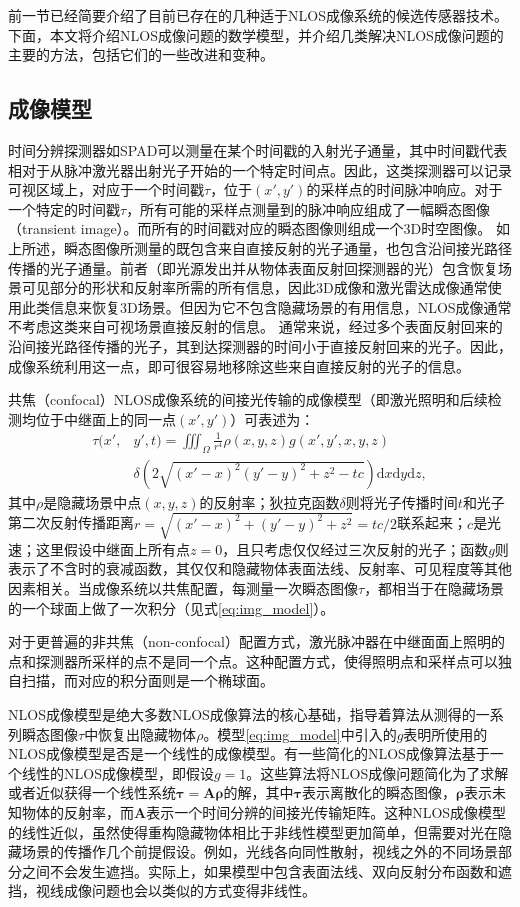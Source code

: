 \documentclass[master]{shtthesis}             %
\begin{document}
前一节已经简要介绍了目前已存在的几种适于NLOS成像系统的候选传感器技术。下面，本文将介绍NLOS成像问题的数学模型，并介绍几类解决NLOS成像问题的主要的方法，包括它们的一些改进和变种。

\subsection{成像模型}

时间分辨探测器如SPAD可以测量在某个时间戳的入射光子通量，其中时间戳代表相对于从脉冲激光器出射光子开始的一个特定时间点。因此，这类探测器可以记录可视区域上，对应于一个时间戳$\tau$，位于$(x',y')$的采样点的时间脉冲响应。对于一个特定的时间戳$\tau$，所有可能的采样点测量到的脉冲响应组成了一幅瞬态图像（transient image）。而所有的时间戳对应的瞬态图像则组成一个3D时空图像。
如上所述，瞬态图像所测量的既包含来自直接反射的光子通量，也包含沿间接光路径传播的光子通量。前者（即光源发出并从物体表面反射回探测器的光）包含恢复场景可见部分的形状和反射率所需的所有信息，因此3D成像和激光雷达成像通常使用此类信息来恢复3D场景。但因为它不包含隐藏场景的有用信息，NLOS成像通常不考虑这类来自可视场景直接反射的信息。
通常来说，经过多个表面反射回来的沿间接光路径传播的光子，其到达探测器的时间小于直接反射回来的光子。因此，成像系统利用这一点，即可很容易地移除这些来自直接反射的光子的信息。

共焦（confocal）NLOS成像系统的间接光传输的成像模型（即激光照明和后续检测均位于中继面上的同一点$(x',y')$）可表述为：
\begin{equation}\label{eq:img_model}
  \begin{split}
    \tau(x',&y',t)=\iiint_\Omega \frac{1}{r^4}\rho(x,y,z)g(x',y',x,y,z)\\ &\delta\left(2\sqrt{(x'-x)^2(y'-y)^2+z^2-tc}\right)\text{d}x\text{d}y\text{d}z,
  \end{split}
\end{equation}
其中$\rho$是隐藏场景中点$(x,y,z)$的反射率；狄拉克函数$\delta$则将光子传播时间$t$和光子第二次反射传播距离$r=\sqrt{(x'-x)^2+(y'-y)^2+z^2}=tc/2$联系起来；$c$是光速；这里假设中继面上所有点$z=0$，且只考虑仅仅经过三次反射的光子；函数$g$则表示了不含时的衰减函数，其仅仅和隐藏物体表面法线、反射率、可见程度等其他因素相关。当成像系统以共焦配置，每测量一次瞬态图像$\tau$，都相当于在隐藏场景的一个球面上做了一次积分（见式\ref{eq:img_model}）。

对于更普遍的非共焦（non-confocal）配置方式，激光脉冲器在中继面面上照明的点和探测器所采样的点不是同一个点。这种配置方式，使得照明点和采样点可以独自扫描，而对应的积分面则是一个椭球面。

NLOS成像模型是绝大多数NLOS成像算法的核心基础，指导着算法从测得的一系列瞬态图像$\tau$中恢复出隐藏物体$\rho$。模型\ref{eq:img_model}中引入的$g$表明所使用的NLOS成像模型是否是一个线性的成像模型。有一些简化的NLOS成像算法基于一个线性的NLOS成像模型，即假设$g=1$。这些算法将NLOS成像问题简化为了求解或者近似获得一个线性系统$\mathbf{\tau=A\rho}$的解，其中$\mathbf{\tau}$表示离散化的瞬态图像，$\mathbf{\rho}$表示未知物体的反射率，而$\mathbf{A}$表示一个时间分辨的间接光传输矩阵。这种NLOS成像模型的线性近似，虽然使得重构隐藏物体相比于非线性模型更加简单，但需要对光在隐藏场景的传播作几个前提假设。例如，光线各向同性散射，视线之外的不同场景部分之间不会发生遮挡。实际上，如果模型中包含表面法线、双向反射分布函数和遮挡，视线成像问题也会以类似的方式变得非线性。
\end{document}
